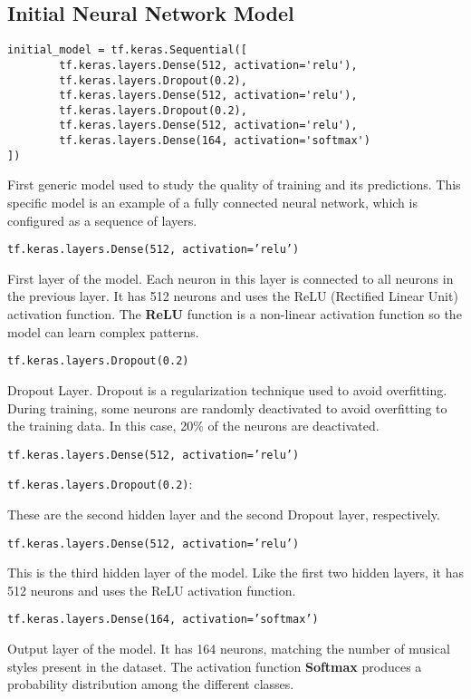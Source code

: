 \subsection{Initial Neural Network Model}

\begin{verbatim}
initial_model = tf.keras.Sequential([
        tf.keras.layers.Dense(512, activation='relu'),
        tf.keras.layers.Dropout(0.2),
        tf.keras.layers.Dense(512, activation='relu'),
        tf.keras.layers.Dropout(0.2),
        tf.keras.layers.Dense(512, activation='relu'),
        tf.keras.layers.Dense(164, activation='softmax')
])
\end{verbatim}

First generic model used to study the quality of training and its predictions.
This specific model is an example of a fully connected neural network, which is configured as a sequence of layers.

\texttt{tf.keras.layers.Dense(512, activation='relu')}

First layer of the model. Each neuron in this layer is connected to all neurons in the previous layer. It has 512 neurons and uses the ReLU (Rectified Linear Unit) activation function. The \textbf{ReLU} function is a non-linear activation function so the model can learn complex patterns.

\texttt{tf.keras.layers.Dropout(0.2)}

Dropout Layer. Dropout is a regularization technique used to avoid overfitting. During training, some neurons are randomly deactivated to avoid overfitting to the training data. In this case, 20\% of the neurons are deactivated.

\texttt{tf.keras.layers.Dense(512, activation='relu')} 

\texttt{tf.keras.layers.Dropout(0.2)}:

These are the second hidden layer and the second Dropout layer, respectively.

\texttt{tf.keras.layers.Dense(512, activation='relu')}

This is the third hidden layer of the model. Like the first two hidden layers, it has 512 neurons and uses the ReLU activation function.

\texttt{tf.keras.layers.Dense(164, activation='softmax')}

Output layer of the model. It has 164 neurons, matching the number of musical styles present in the dataset. The activation function \textbf{Softmax} produces a probability distribution among the different classes.


